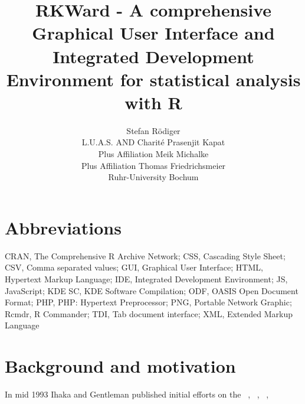 \documentclass[article,shortnames]{jss}
\author{Stefan R\"odiger\\L.U.A.S. AND Charit\'e
	\And Prasenjit Kapat\\Plus Affiliation
	\And Meik Michalke\\Plus Affiliation
	\And Thomas Friedrichsmeier\\Ruhr-University Bochum}
\title{RKWard - A comprehensive Graphical User Interface and Integrated Development Environment for statistical analysis with {R}}
\begin{document}

\section[Abbreviations]{Abbreviations}
CRAN, The Comprehensive R Archive Network; CSS, Cascading Style Sheet;
CSV, Comma separated values; GUI, Graphical User Interface; HTML,
Hypertext Markup Language; IDE, Integrated Development Environment; JS,
JavaScript; KDE SC, KDE Software Compilation; ODF, OASIS Open Document
Format; PHP, PHP: Hypertext Preprocessor; PNG, Portable Network
Graphic; Rcmdr, R Commander; TDI, Tab document interface; XML, Extended
Markup Language

\section[Background and motivation]{Background and motivation}
In mid 1993 Ihaka and Gentleman published initial efforts on the ~\cite{Kuhn2006}, ~\cite{Fox2008}, ~\cite{Zhang2004}, ~\cite{RDCT2004}


\end{document}
